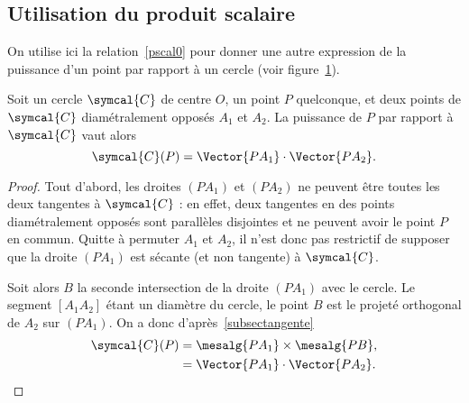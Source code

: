 \subsection{Utilisation du produit scalaire}
On utilise ici la relation~\eqref{pscal0} pour donner une autre expression de la puissance d'un point par rapport à un cercle (voir figure~\ref{figpscal2}).
\begin{thm}
Soit un cercle $\symcal{C}$ de centre $O$, un point $P$ quelconque, et deux points de $\symcal{C}$ diamétralement opposés $A_1$ et $A_2$. La puissance de $P$ par rapport à $\symcal{C}$ vaut alors
\[\symcal{C}(P)=\Vector{PA_1}\cdot\Vector{PA_2}.\]
\end{thm}

\begin{figure}[ht]
\centering
{}
\figcaption{}\label{figpscal2}
\end{figure}

\begin{proof}%
Tout d'abord, les droites $(PA_1)$ et $(PA_2)$ ne peuvent être toutes les deux tangentes à $\symcal{C}$ : en effet, deux tangentes en des points diamétralement opposés sont parallèles disjointes et ne peuvent avoir le point $P$ en commun. Quitte à permuter $A_1$ et $A_2$, il n'est donc pas restrictif de supposer que la droite $(PA_1)$ est sécante (et non tangente) à $\symcal{C}$.

Soit alors $B$ la seconde intersection de la droite $(PA_1)$ avec le cercle. Le segment $[A_1A_2]$ étant un diamètre du cercle, le point $B$ est le projeté orthogonal de $A_2$ sur $(PA_1)$. On a donc d'après \ref{subsectangente}
\begin{align*}
\symcal{C}(P)&=\mesalg{PA_1}\times\mesalg{PB},\\
&=\Vector{PA_1}\cdot\Vector{PA_2}.\qedhere
\end{align*}
\end{proof}


